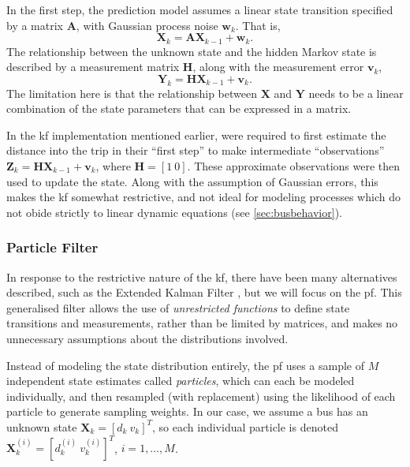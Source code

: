\documentclass[12pt,a4paper]{article}
\newcommand{\bY}{\mathbf{Y}}
\newcommand{\bX}{\mathbf{X}}
\newcommand{\bZ}{\mathbf{Z}}
\newcommand{\mat}[1]{\mathbf{#1}}
\begin{document}
In the first step, the prediction model assumes a linear state transition specified by
a matrix $\mat{A}$, with Gaussian process noise $\mat{w}_k$.
That is, 
\begin{equation}
  \label{eq:kf_statetransition}
  \bX_k = \mat{A}\bX_{k-1} + \mat{w}_k.
\end{equation}
The relationship between the unknown state and the hidden Markov state is described
by a measurement matrix $\mat{H}$, along with the measurement error $\mat{v}_k$,
\begin{equation}
  \label{eq:kf_measurement}
  \bY_k = \mat{H}\bX_{k-1} + \mat{v}_k.
\end{equation}
The limitation here is that the relationship between $\bX$ and $\bY$ needs to be a linear
combination of the state parameters that can be expressed in a matrix.


In the \gls{kf} implementation mentioned earlier,
\cite{cathey-dailey:2003} were required to first estimate the 
distance into the trip in their ``first step'' to make intermediate ``observations''
$\bZ_k = \mat{H}\bX_{k-1} + \mat{v}_k$, where $\mat{H} = [1\ 0]$.
These approximate observations were then used to update the state.
Along with the assumption of Gaussian errors,
this makes the \gls{kf} somewhat restrictive,
and not ideal for modeling processes which do not obide strictly to linear dynamic equations
(see \cref{sec:busbehavior}).



\subsubsection{Particle Filter}
\label{sec:particle_filter}

In response to the restrictive nature of the \gls{kf}, there have been many 
alternatives described, such as the Extended Kalman Filter \citep{cn},
but we will focus on the \gls{pf}.
This generalised filter allows the use of \emph{unrestricted functions} to define
state transitions and measurements, rather than be limited by matrices,
and makes no unnecessary assumptions about the distributions involved.


Instead of modeling the state distribution entirely, 
the \gls{pf} uses a sample of $M$ independent state estimates called \emph{particles}, 
which can each be modeled individually, and then resampled (with replacement) 
using the likelihood of each particle to generate sampling weights.
In our case, we assume a bus has an unknown state $\bX_k = [d_k\ v_k]^T$,
so each individual particle is denoted $\bX_k^{(i)} = [d_k^{(i)}\ v_k^{(i)}]^T$,
$i = 1, \ldots, M$.
\end{document}
